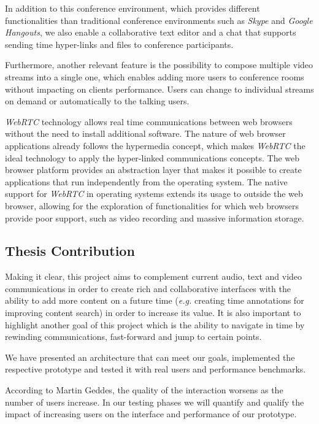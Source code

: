 \documentclass[10pt,conference]{IEEEtran}
\begin{document}
	In addition to this conference environment, which provides different functionalities than traditional conference environments such as \emph{Skype} and \emph{Google Hangouts}, we also enable a collaborative text editor and a chat that supports sending time hyper-links and files to conference participants.

	Furthermore, another relevant feature is the possibility to compose multiple video streams into a single one, which enables adding more users to conference rooms without impacting on clients performance. Users can change to individual streams on demand or automatically to the talking users.
        


\emph{WebRTC} technology allows real time communications between web browsers without the need to install additional software. The nature of web browser applications already follows the hypermedia concept, which makes \emph{WebRTC} the ideal technology to apply the hyper-linked communications concepts.
The web browser platform provides an abstraction layer that makes it possible to create applications that run independently from the operating system.
The native support for \emph{WebRTC} in operating systems extends its usage to outside the web browser, allowing for the exploration of functionalities for which web browsers provide poor support, such as video recording and massive information storage.

\subsection{Thesis Contribution}
\label{section:contribution}

Making it clear, this project aims to complement current audio, text and video communications in order to create rich and collaborative interfaces with the ability to add more content on a future time (\emph{e.g.} creating time annotations for improving content search) in order to increase its value. It is also important to highlight another goal of this project which is the ability to navigate in time by rewinding communications, fast-forward and jump to certain points.

	We have presented an architecture that can meet our goals, implemented the respective prototype and tested it with real users and performance benchmarks.

	According to Martin Geddes, the quality of the interaction worsens as the number of users increase\cite{geddes}. In our testing phases we will quantify and qualify the impact of increasing users on the interface and performance of our prototype. 
\end{document}
